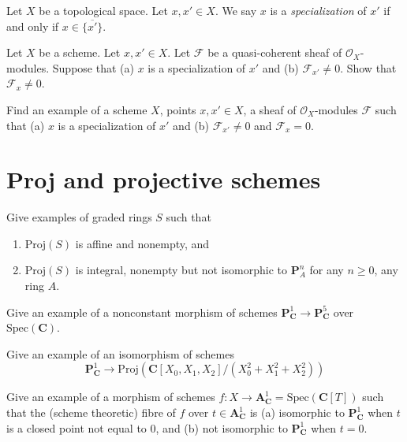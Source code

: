 \begin{definition}
Let $X$ be a topological space. Let $x, x' \in X$.
We say $x$ is a {\it specialization} of $x'$ 
if and only if $x \in \overline{\{x'\}}$.
\end{definition}

\begin{exercise}
\label{exercise-quasi-coherent-specialization-points}
Let $X$ be a scheme. Let $x, x' \in X$. Let $\mathcal{F}$ be
a quasi-coherent sheaf of $\mathcal{O}_X$-modules.
Suppose that (a) $x$ is a specialization of $x'$ and (b)
$\mathcal{F}_{x'} \not = 0$. Show that $\mathcal{F}_x \not = 0$.
\end{exercise}

\begin{exercise}
\label{exercise-O-module-specialization-points}
Find an example of a scheme $X$, points $x, x' \in X$,
a sheaf of $\mathcal{O}_X$-modules
$\mathcal{F}$ such that (a) $x$ is a specialization of $x'$ and (b)
$\mathcal{F}_{x'} \not = 0$ and $\mathcal{F}_x = 0$.
\end{exercise}

\section{Proj and projective schemes}
\label{section-proj}

\begin{exercise}
Give examples of graded rings $S$ such that
\begin{enumerate}
\item $\text{Proj}(S)$ is affine and nonempty, and
\item $\text{Proj}(S)$ is integral, nonempty but not isomorphic
to ${\mathbf P}^n_A$ for any $n\geq 0$, any ring $A$.
\end{enumerate}
\end{exercise}

\begin{exercise}
Give an example of a nonconstant morphism
of schemes ${\mathbf P}^1_{\mathbf C} \to {\mathbf P}^5_{\mathbf C}$ over
$\text{Spec}({\mathbf C})$.
\end{exercise}

\begin{exercise}
Give an example of an isomorphism of schemes
$$
{\mathbf P}^1_{\mathbf C} \to
\text{Proj}({\mathbf C}[X_0,X_1,X_2]/(X_0^2+X_1^2+X_2^2))
$$
\end{exercise}

\begin{exercise}
Give an example of a morphism of schemes
$f : X \to {\mathbf A}^1_{\mathbf C}=\text{Spec}({\mathbf C}[T])$ such that the
(scheme theoretic) fibre of $f$ over $t \in {\mathbf A}^1_{\mathbf C}$ is (a)
isomorphic to ${\mathbf P}^1_{\mathbf C}$ when $t$ is a closed point not equal
to $0$, and (b) not isomorphic to ${\mathbf P}^1_{\mathbf C}$ when $t=0$. 
\end{exercise}


